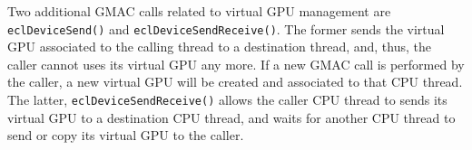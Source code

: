 Two additional GMAC calls related to virtual GPU management are \texttt{ecl\-Device\-Send()} and 
\texttt{ecl\-Device\-Send\-Receive()}. The former sends the virtual GPU associated to the calling 
thread to a destination thread, and, thus, the caller cannot uses its virtual GPU any more. If a new 
GMAC call is performed by the caller, a new virtual GPU will be created and associated to that CPU 
thread. The latter, \texttt{ecl\-Device\-Send\-Receive()} allows the caller CPU thread to sends its 
virtual GPU to a destination CPU thread, and waits for another CPU thread to send or copy its 
virtual GPU to the caller. 

